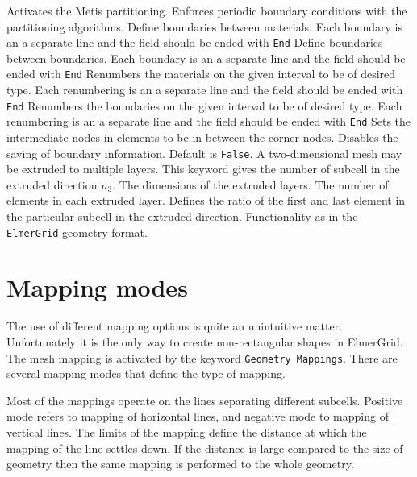 %
Activates the Metis partitioning.
%
Enforces periodic boundary conditions with the partitioning algorithms.
%
Define boundaries between materials. 
Each boundary is an a separate line
and the field should be ended with \texttt{End}
%
Define boundaries between boundaries.
Each boundary is an a separate line
and the field should be ended with \texttt{End}
%
Renumbers the materials on the given interval to be of desired type.
Each renumbering is an a separate line
and the field should be ended with \texttt{End}
%
Renumbers the boundaries on the given interval to be of desired type.
Each renumbering is an a separate line
and the field should be ended with \texttt{End}
%
Sets the intermediate nodes in elements to be in between 
the corner nodes.
%
Disables the saving of boundary information.
Default is \texttt{False}.
%
A two-dimensional mesh may be extruded to multiple layers. This
keyword gives the number of subcell in the extruded direction $n_3$.
The dimensions of the extruded layers.
The number of elements in each extruded layer.
Defines the ratio of the first and last element in the particular
subcell in the extruded direction.
Functionality as in the \texttt{ElmerGrid} geometry format.
%
\sifend



\section{Mapping modes}
The use of different mapping options is quite an 
unintuitive matter. Unfortunately it is the only way to 
create non-rectangular shapes in ElmerGrid. 
The mesh mapping is activated by the keyword \texttt{Geometry Mappings}.
There are several mapping modes that define the type of mapping.

Most of the mappings operate on the lines separating different subcells.
Positive mode refers to mapping of horizontal lines, 
and negative mode to mapping of vertical lines.
The limits of the mapping define the distance at which the 
mapping of the line settles down. If the distance is large compared to 
the size of geometry then the same mapping is performed to the 
whole geometry. 

